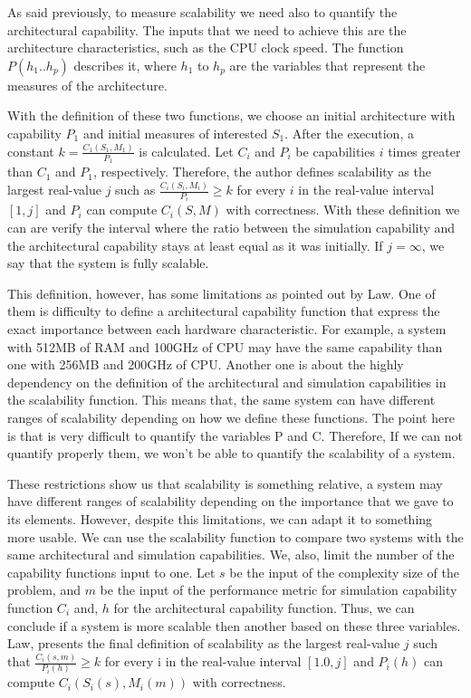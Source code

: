 As said previously, to measure scalability we need also to quantify the architectural capability. The inputs that we need to achieve this are the architecture characteristics, such as the CPU clock speed. The function $P(h_{1}..h_{p})$ describes it, where $h_{1}$ to $h_{p}$ are the variables that represent the measures of the architecture.

With the definition of these two functions, we choose an initial architecture with capability $P_{1}$ and initial measures of interested $S_{1}$. After the execution, a constant $k = \frac{C_{1}(S_{1},M_{1})}{P_{1}}$ is calculated. Let $C_{i}$ and $P_{i}$ be capabilities $i$ times greater than $C_{1}$ and $P_{1}$, respectively. Therefore, the author defines scalability as the largest real-value $j$ such as $\frac{C_{i}(S_{i},M_{i})}{P_{i}} \geq k$ for every $i$ in the real-value interval $[1,j]$ and $P_{i}$ can compute $C_{i}(S,M)$ with correctness. With these definition we can are verify the interval where the ratio between the simulation capability and the architectural capability stays at least equal as it was initially. If $j = \infty$, we say that the system is fully scalable.

This definition, however, has some limitations as pointed out by Law. One of them is  difficulty to define a architectural capability function that express the exact importance between each hardware characteristic. For example, a system with 512MB of RAM and 100GHz of CPU may have the same capability than one with 256MB and 200GHz of CPU. Another one is about the highly dependency on the definition of the architectural and simulation capabilities in the scalability function. This means that, the same system can have different ranges of scalability depending on how we define these functions. The point here is that is very difficult to quantify the variables P and C. Therefore, If we can not quantify properly them, we won't be able to quantify the scalability of a system. 

These restrictions show us that scalability is something relative, a system may have different ranges of scalability depending on the importance that we gave to its elements. However, despite this limitations, we can adapt it to something more usable. We can use the scalability function to compare two systems with the same architectural and simulation capabilities. We, also, limit the number of the capability functions input to one. Let $s$ be the input of the complexity size of the problem, and $m$ be the input of the performance metric for simulation capability function $C_{i}$ and, $h$ for the architectural capability function. Thus, we can conclude if a system is more scalable then another based on these three variables. Law, presents the final definition of scalability as the largest real-value $j$ such that $\frac{C_{i}(s, m)}{P_{i}(h)} \geq k$ for every i in the real-value interval $[1.0, j]$ and $P_{i}(h)$ can compute $C_{i}(S_{i}(s), M_{i}(m))$ with correctness.


